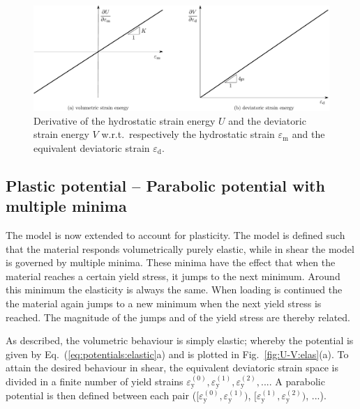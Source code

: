 \documentclass[times,namecite]{goose-article}
\begin{document}
\begin{figure}[htp]
  \centering
  \includegraphics[width=1.\textwidth]{figures/potential_dU-dV_elas}
  \caption{Derivative of the hydrostatic strain energy $U$ and the deviatoric strain energy $V$ w.r.t.\ respectively the hydrostatic strain $\varepsilon_\mathrm{m}$ and the equivalent deviatoric strain $\varepsilon_\mathrm{d}$.}
  \label{fig:dU-dV:elas}
\end{figure}

\subsection{Plastic potential -- Parabolic potential with multiple minima}

The model is now extended to account for plasticity. The model is defined such that the material responds volumetrically purely elastic, while in shear the model is governed by multiple minima. These minima have the effect that when the material reaches a certain yield stress, it jumps to the next minimum. Around this minimum the elasticity is always the same. When loading is continued the the material again jumps to a new minimum when the next yield stress is reached. The magnitude of the jumps and of the yield stress are thereby related.

As described, the volumetric behaviour is simply elastic; whereby the potential is given by Eq.~(\ref{eq:potentials:elastic}a) and is plotted in Fig.~\ref{fig:U-V:elas}(a). To attain the desired behaviour in shear, the equivalent deviatoric strain space is divided in a finite number of yield strains $\varepsilon_\mathrm{y}^{(0)}, \varepsilon_\mathrm{y}^{(1)}, \varepsilon_\mathrm{y}^{(2)}, ...$. A parabolic potential is then defined between each pair ($[ \varepsilon_\mathrm{y}^{(0)}, \varepsilon_\mathrm{y}^{(1)} )$, $[ \varepsilon_\mathrm{y}^{(1)}, \varepsilon_\mathrm{y}^{(2)} )$, ...).
\end{document}
